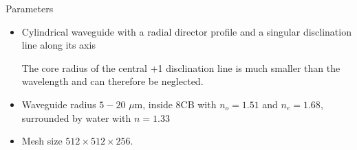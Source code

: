 \documentclass[8pt]{beamer}
\newlength{\wideitemsep}
\let\olditem\item
\renewcommand{\item}{\setlength{\itemsep}{\wideitemsep}\olditem}
\newcommand{\blockpadding}{
  \rule[-0.6ex]{0pt}{2.5ex}
}
\begin{document}
\begin{columns}[t]
\begin{column}{.36\textwidth}
\begin{block}{\blockpadding Parameters}
\begin{itemize}
\item Cylindrical waveguide with a radial director profile and a singular disclination line along its axis \\
\begin{figure}[h]
\centering
{}
\end{figure}
The core radius of the central +1 disclination line is much smaller than the wavelength and can therefore be neglected. 
\item Waveguide radius $5 - 20$ $\mu$m, inside 8CB with $n_o = 1.51$ and $n_e = 1.68$, surrounded by water with $n = 1.33$
\item Mesh size $512 \times 512 \times 256$.

 \end{itemize}
 \end{block}


 \end{column}
 

\end{columns}
\end{document}
